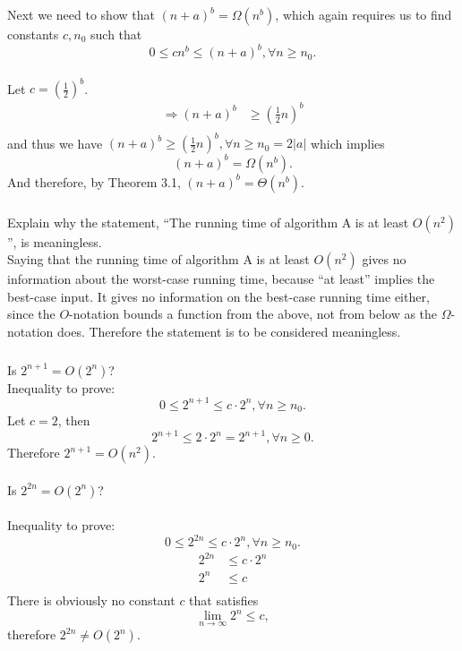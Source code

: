 \documentclass[11pt]{article}
\numberwithin{equation}{section}
\begin{document}
Next we need to show that $(n+a)^b = \Omega(n^b)$, which again 
requires us to find constants $c, n_0$ such that
\[0 \leq cn^b \leq (n+a)^b, \forall n \geq n_0.\]\\
Let $c=(\frac{1}{2})^b$.
\begin{equation*}
    \begin{split}
        \Rightarrow (n+a)^b & \geq (\frac{1}{2}n)^b\\
    \end{split}
\end{equation*}
and thus we have $(n+a)^b \geq (\frac{1}{2}n)^b, \forall n \geq n_0 = 2|a|$ which implies 
\[(n+a)^b = \Omega(n^b).\]
And therefore, by Theorem 3.1, $(n+a)^b = \Theta(n^b)$.

\subsubsection{}
Explain why the statement, ``The running time of algorithm A
is at least $O(n^2)$'', is meaningless.
~\\

Saying that the running time of algorithm A is at least $O(n^2)$ gives
no information about the worst-case running time, because ``at least''
implies the best-case input.
It gives no information on the best-case running time either, since
the $O$-notation bounds a function from the above, not from below as 
the $\Omega$-notation does. Therefore the statement is to be considered
meaningless.

\subsubsection{}
Is $2^{n+1} = O(2^n)$?\\

Inequality to prove: \[0 \leq 2^{n+1} \leq c \cdot 2^n, \forall n \geq n_0.\]
Let $c = 2$, then
\[2^{n+1} \leq 2 \cdot 2^n = 2^{n+1}, \forall n \geq 0.\]
Therefore $2^{n+1} = O(n^2)$.\\
\pagebreak
~\\
Is $2^{2n} = O(2^n)$?
~\\~\\
Inequality to prove: \[0 \leq 2^{2n} \leq c \cdot 2^n, \forall n \geq n_0.\]
\begin{equation*}
    \begin{split}
        2^{2n} & \leq c \cdot 2^n\\
        2^{n} & \leq c\\
    \end{split}
\end{equation*}
There is obviously no constant $c$ that satisfies
\[\lim_{n \to \infty} 2^{n} \leq c,\]
therefore $2^{2n} \neq O(2^n)$.
\end{document}
